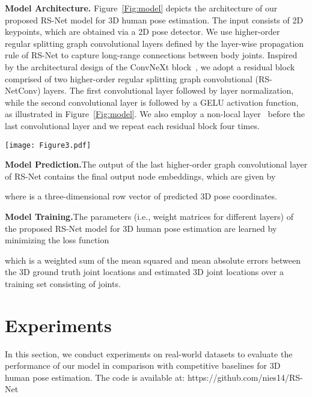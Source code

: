 \documentclass[10pt,journal]{IEEEtran}
\begin{document}
\medskip\noindent\textbf{Model Architecture.} Figure~\ref{Fig:model} depicts the architecture of our proposed RS-Net model for 3D human pose estimation. The input consists of 2D keypoints, which are obtained via a 2D pose detector. We use higher-order regular splitting graph convolutional layers defined by the layer-wise propagation rule of RS-Net to capture long-range connections between body joints. Inspired by the architectural design of the ConvNeXt block~\cite{liu2022convnet}, we adopt a residual block comprised of two higher-order regular splitting graph convolutional (RS-NetConv) layers. The first convolutional layer followed by layer normalization, while the second convolutional layer is followed by a GELU activation function, as illustrated in Figure~\ref{Fig:model}. We also employ a non-local layer~\cite{wang2018non} before the last convolutional layer and we repeat each residual block four times.
	
\begin{figure*}[!htb]
\centering
\texttt{[image: Figure3.pdf]}
\caption{Overview of the proposed network architecture for 3D pose estimation. Our model takes 2D pose coordinates (16 or 17 joints) as input and generates 3D pose predictions (16 or 17 joints) as output. We use ten higher-order graph convolutional layers with four residual blocks. In each residual block, the first convolutional layer is followed by layer normalization, while the second convolutional layer is followed by a GELU activation function, except for the last convolutional layer which is preceded by a non-local layer.}
\label{Fig:model}
\end{figure*}

\medskip\noindent\textbf{Model Prediction.}\quad The output of the last higher-order graph convolutional layer of RS-Net contains the final output node embeddings, which are given by

where  is a three-dimensional row vector of predicted 3D pose coordinates.

\medskip\noindent\textbf{Model Training.}\quad The parameters (i.e., weight matrices for different layers) of the proposed RS-Net model for 3D human pose estimation are learned by minimizing the loss function

which is a weighted sum of the mean squared and mean absolute errors between the 3D ground truth joint locations  and estimated 3D joint locations  over a training set consisting of  joints.
	
\section{Experiments}
In this section, we conduct experiments on real-world datasets to evaluate the performance of our model in comparison with competitive baselines for 3D human pose estimation. The code is available at: https://github.com/nies14/RS-Net
\end{document}
